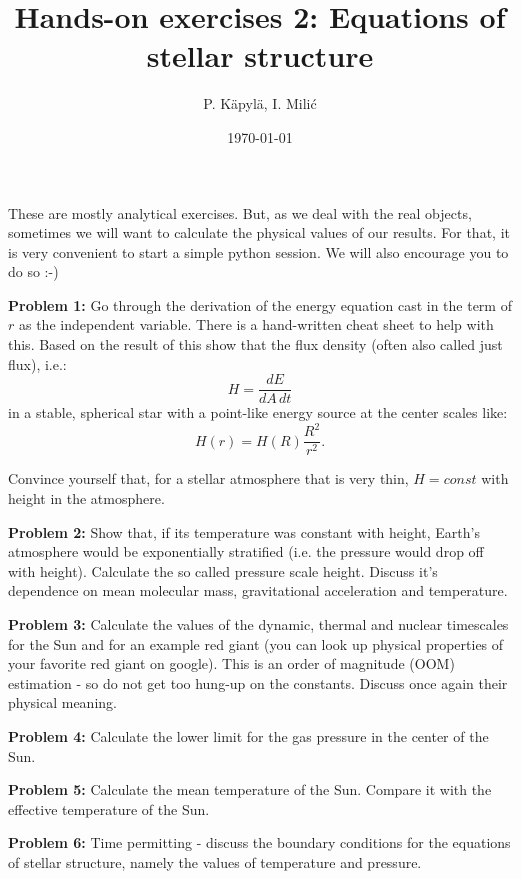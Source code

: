 \documentclass[12pt]{article}
\title{Hands-on exercises 2: Equations of stellar structure}
\author{P. K\"{a}pyl\"{a}, I. Mili\'{c}}
\date{\today}
\begin{document}
\maketitle


These are mostly analytical exercises. But, as we deal with the real objects, sometimes we will want to calculate the physical values of our results. For that, it is very convenient to start a simple python session. We will also encourage you to do so :-) 

{\bf Problem 1:} Go through the derivation of the energy equation cast in the term of $r$ as the independent variable. There is a hand-written cheat sheet to help with this. Based on the result of this show that the flux density (often also called just flux), i.e.:
\begin{equation}
H = \frac{dE}{dA\,dt}
\end{equation}
in a stable, spherical star with a point-like energy source at the center scales like: 
\begin{equation}
H(r) = H(R) \frac{R^2}{r^2}.
\end{equation}

Convince yourself that, for a stellar atmosphere that is very thin, $H=const$ with height in the atmosphere. 

{\bf Problem 2:} Show that, if its temperature was constant with height, Earth's atmosphere would be exponentially stratified (i.e. the pressure would drop off with height). Calculate the so called pressure scale height. Discuss it's dependence on mean molecular mass, gravitational acceleration and temperature.

{\bf Problem 3:} Calculate the values of the dynamic, thermal and nuclear timescales for the Sun and for an example red giant (you can look up physical properties of your favorite red giant on google). This is an order of magnitude (OOM) estimation - so do not get too hung-up on the constants. Discuss once again their physical meaning. 

{\bf Problem 4:} Calculate the lower limit for the gas pressure in the center of the Sun. 

{\bf Problem 5:} Calculate the mean temperature of the Sun. Compare it with the effective temperature of the Sun. 

{\bf Problem 6:} Time permitting - discuss the boundary conditions for the equations of stellar structure, namely the values of temperature and pressure. 
\end{document}
